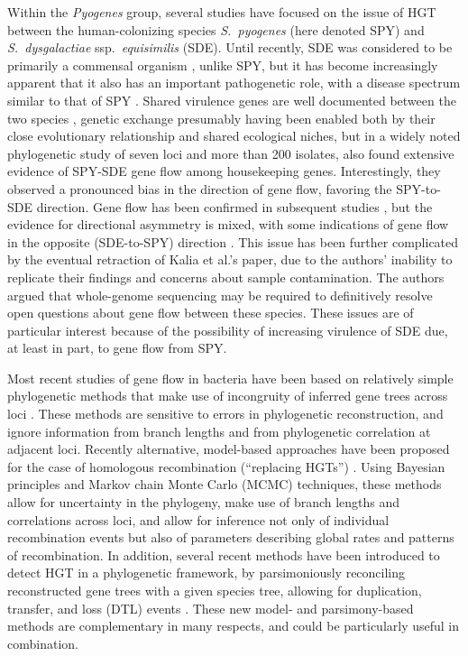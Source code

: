\documentclass[12pt]{article}
\begin{document}
Within the {\em Pyogenes} group, several studies have focused on the issue
of HGT between the human-colonizing species {\em S.\ pyogenes} (here
denoted SPY) and {\em S.\ dysgalactiae} ssp.\ {\em equisimilis} (SDE).
Until recently, SDE was considered to be primarily a commensal organism
\citep{Vandamme1996}, unlike SPY, but it has become increasingly apparent
that it also has an important pathogenetic role, with a disease spectrum
similar to that of SPY \citep{Brandt2009}.  Shared virulence genes are well
documented between the two species \citep[e.g.,][]{Davies2007a}, genetic
exchange presumably having been enabled both by their close evolutionary
relationship and shared ecological niches, but
in a widely noted phylogenetic study of seven loci and more than 200
isolates, \cite{Kalia2001} also found extensive evidence of SPY-SDE gene
flow among housekeeping genes.  Interestingly, they observed a pronounced
bias in the direction of gene flow, favoring the SPY-to-SDE direction.
Gene flow has been confirmed in subsequent studies
\citep{Kalia2004,Davies2005,Davies2007a,Davies2007}, but the evidence for
directional asymmetry is mixed, with some indications of gene flow in the
opposite (SDE-to-SPY) direction \citep{Sachse2002}.  This issue has been
further complicated by the eventual retraction of Kalia et al.'s
\citeyearpar{Kalia2001} paper, due to the authors' inability to replicate
their findings and concerns about sample contamination.  The authors argued
that whole-genome sequencing may be required to definitively resolve open
questions about gene flow between these species.  These issues are of
particular interest because of the possibility of increasing virulence of
SDE due, at least in part, to gene flow from SPY.

Most recent studies of gene flow in bacteria have been based on relatively
simple phylogenetic methods that make use of incongruity of inferred gene
trees across loci \citep[e.g.,][]{Kalia2001,Kalia2004,Ahmad2009}.  These
methods are sensitive to errors in phylogenetic reconstruction, and ignore
information from branch lengths and from phylogenetic correlation at
adjacent loci.  Recently alternative, model-based approaches have been
proposed for the case of homologous recombination (``replacing HGTs'')
\citep{Didelot2007,Didelot2010}.  Using Bayesian principles and Markov
chain Monte Carlo (MCMC) techniques, these methods allow for uncertainty in
the phylogeny, make use of branch lengths and correlations across loci, and
allow for inference not only of individual recombination events but also of
parameters describing global rates and patterns of recombination.  In
addition, several recent methods have been introduced to detect HGT in a
phylogenetic framework, by parsimoniously reconciling reconstructed gene
trees with a given species tree, allowing for duplication, transfer, and
loss (DTL) events \citep{Merkle2010,David2011,Doyon2011,Doyon2011b}.  These
new model- and parsimony-based methods are complementary in many respects,
and could be particularly useful in combination.
\end{document}
